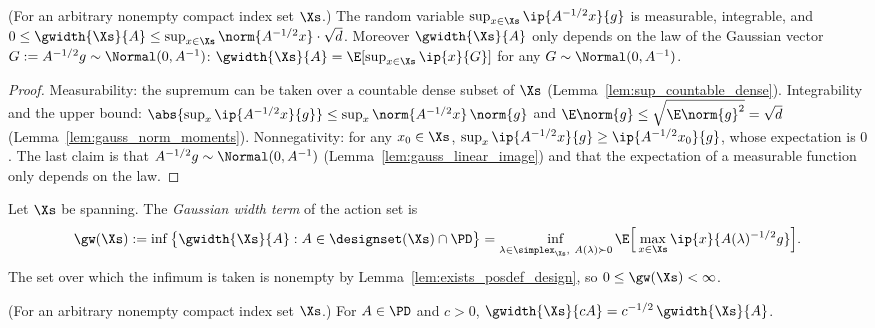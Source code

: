 \begin{lemma}\label{lem:width_matrix_wd}
\leanok
{}
(For an arbitrary nonempty compact index set $\Xs$.) The random variable $\sup_{x\in\Xs}\ip{A^{-1/2}x}{g}$ is measurable, integrable, and
$0 \le \gwidth{\Xs}{A} \le \sup_{x\in\Xs}\norm{A^{-1/2}x}\cdot \sqrt d$.
Moreover $\gwidth{\Xs}{A}$ only depends on the law of the Gaussian vector
$G := A^{-1/2}g \sim \Normal(0, A^{-1})$: $\gwidth{\Xs}{A} = \E[\sup_{x\in\Xs}\ip{x}{G}]$ for
any $G \sim \Normal(0,A^{-1})$.
\end{lemma}

\begin{proof}
\leanok
{}
Measurability: the supremum can be taken over a countable dense subset of $\Xs$
(Lemma~\ref{lem:sup_countable_dense}). Integrability and the upper bound:
$\abs{\sup_x \ip{A^{-1/2}x}{g}} \le \sup_x\norm{A^{-1/2}x}\,\norm{g}$ and
$\E\norm{g} \le \sqrt{\E\norm{g}^2} = \sqrt d$ (Lemma~\ref{lem:gauss_norm_moments}).
Nonnegativity: for any $x_0\in\Xs$, $\sup_x \ip{A^{-1/2}x}{g} \ge \ip{A^{-1/2}x_0}{g}$, whose
expectation is $0$. The last claim is that $A^{-1/2}g \sim \Normal(0,A^{-1})$
(Lemma~\ref{lem:gauss_linear_image}) and that the expectation of a measurable function only
depends on the law.
\end{proof}

\begin{definition}\label{def:width}
\leanok
{}
Let $\Xs$ be spanning. The \emph{Gaussian width term} of the action set is
\[
  \gw(\Xs) := \inf\big\{ \gwidth{\Xs}{A} : A \in \designset(\Xs) \cap \PD \big\}
  = \inf_{\lambda \in \simplex_{\Xs},\ A(\lambda)\succ 0}
    \E\Big[\max_{x\in\Xs}\ip{x}{A(\lambda)^{-1/2}g}\Big].
\]
The set over which the infimum is taken is nonempty by Lemma~\ref{lem:exists_posdef_design},
so $0 \le \gw(\Xs) < \infty$.
\end{definition}

\begin{lemma}[Homogeneity]\label{lem:width_homog}
\leanok
{}
(For an arbitrary nonempty compact index set $\Xs$.) For $A \in \PD$ and $c > 0$,
$\gwidth{\Xs}{cA} = c^{-1/2}\,\gwidth{\Xs}{A}$.
\end{lemma}

